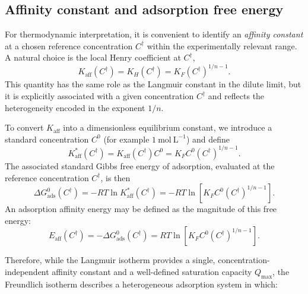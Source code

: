\documentclass[12pt]{article}
\begin{document}
	\subsection{Affinity constant and adsorption free energy}
	
	For thermodynamic interpretation, it is convenient to identify an
	\emph{affinity constant} at a chosen reference concentration
	\(C^{\dagger}\) within the experimentally relevant range. A
	natural choice is the local Henry coefficient at \(C^{\dagger}\),
	\begin{equation}
		K_{\mathrm{aff}}\!\left(C^{\dagger}\right)
		= K_H\!\left(C^{\dagger}\right)
		= K_F \left(C^{\dagger}\right)^{1/n - 1}.
	\end{equation}
	This quantity has the same role as the Langmuir constant in the
	dilute limit, but it is explicitly associated with a given
	concentration \(C^{\dagger}\) and reflects the heterogeneity
	encoded in the exponent \(1/n\).
	
	To convert \(K_{\mathrm{aff}}\) into a dimensionless equilibrium
	constant, we introduce a standard concentration \(C^0\) (for example
	\(1~\mathrm{mol~L^{-1}}\)) and define
	\begin{equation}
		K_{\mathrm{aff}}^{\ast}\!\left(C^{\dagger}\right)
		= K_{\mathrm{aff}}\!\left(C^{\dagger}\right) C^0
		= K_F C^0 \left(C^{\dagger}\right)^{1/n - 1}.
	\end{equation}
	The associated standard Gibbs free energy of adsorption, evaluated
	at the reference concentration \(C^{\dagger}\), is then
	\begin{equation}
		\Delta G_{\mathrm{ads}}^{0}\!\left(C^{\dagger}\right)
		= - R T
		\ln K_{\mathrm{aff}}^{\ast}\!\left(C^{\dagger}\right)
		= - R T
		\ln\!\left[
		K_F C^0 \left(C^{\dagger}\right)^{1/n - 1}
		\right].
	\end{equation}
	An adsorption affinity energy may be defined as the magnitude of
	this free energy:
	\begin{equation}
		E_{\mathrm{aff}}\!\left(C^{\dagger}\right)
		= - \Delta G_{\mathrm{ads}}^{0}\!\left(C^{\dagger}\right)
		= R T
		\ln\!\left[
		K_F C^0 \left(C^{\dagger}\right)^{1/n - 1}
		\right].
	\end{equation}
	
	Therefore, while the Langmuir isotherm provides a single,
	concentration-independent affinity constant and a well-defined
	saturation capacity \(Q_{\max}\), the Freundlich isotherm describes
	a heterogeneous adsorption system in which:
	
\end{document}
